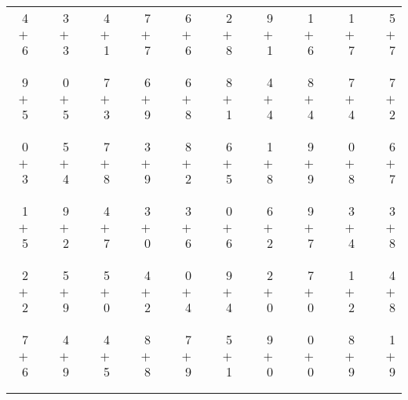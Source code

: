 \documentclass[12pt, letterpaper]{article}
\begin{document}
\begin{tabular}{rrrrrrrrrrrrrrrrrrr}
4 & & 3 & & 4 & & 7 & & 6 & & 2 & & 9 & & 1 & & 1 & & 5\\
$+$ 6 & & $+$ 3 & & $+$ 1 & & $+$ 7 & & $+$ 6 & & $+$ 8 & & $+$ 1 & & $+$ 6 & & $+$ 7 & & $+$ 7\\
\cline{1-1} \cline{3-3} \cline{5-5} \cline{7-7} \cline{9-9} \cline{11-11} \cline{13-13} \cline{15-15} \cline{17-17} \cline{19-19} \\ \\
9 & & 0 & & 7 & & 6 & & 6 & & 8 & & 4 & & 8 & & 7 & & 7\\
$+$ 5 & & $+$ 5 & & $+$ 3 & & $+$ 9 & & $+$ 8 & & $+$ 1 & & $+$ 4 & & $+$ 4 & & $+$ 4 & & $+$ 2\\
\cline{1-1} \cline{3-3} \cline{5-5} \cline{7-7} \cline{9-9} \cline{11-11} \cline{13-13} \cline{15-15} \cline{17-17} \cline{19-19} \\ \\
0 & & 5 & & 7 & & 3 & & 8 & & 6 & & 1 & & 9 & & 0 & & 6\\
$+$ 3 & & $+$ 4 & & $+$ 8 & & $+$ 9 & & $+$ 2 & & $+$ 5 & & $+$ 8 & & $+$ 9 & & $+$ 8 & & $+$ 7\\
\cline{1-1} \cline{3-3} \cline{5-5} \cline{7-7} \cline{9-9} \cline{11-11} \cline{13-13} \cline{15-15} \cline{17-17} \cline{19-19} \\ \\
1 & & 9 & & 4 & & 3 & & 3 & & 0 & & 6 & & 9 & & 3 & & 3\\
$+$ 5 & & $+$ 2 & & $+$ 7 & & $+$ 0 & & $+$ 6 & & $+$ 6 & & $+$ 2 & & $+$ 7 & & $+$ 4 & & $+$ 8\\
\cline{1-1} \cline{3-3} \cline{5-5} \cline{7-7} \cline{9-9} \cline{11-11} \cline{13-13} \cline{15-15} \cline{17-17} \cline{19-19} \\ \\
2 & & 5 & & 5 & & 4 & & 0 & & 9 & & 2 & & 7 & & 1 & & 4\\
$+$ 2 & & $+$ 9 & & $+$ 0 & & $+$ 2 & & $+$ 4 & & $+$ 4 & & $+$ 0 & & $+$ 0 & & $+$ 2 & & $+$ 8\\
\cline{1-1} \cline{3-3} \cline{5-5} \cline{7-7} \cline{9-9} \cline{11-11} \cline{13-13} \cline{15-15} \cline{17-17} \cline{19-19} \\ \\
7 & & 4 & & 4 & & 8 & & 7 & & 5 & & 9 & & 0 & & 8 & & 1\\
$+$ 6 & & $+$ 9 & & $+$ 5 & & $+$ 8 & & $+$ 9 & & $+$ 1 & & $+$ 0 & & $+$ 0 & & $+$ 9 & & $+$ 9\\
\cline{1-1} \cline{3-3} \cline{5-5} \cline{7-7} \cline{9-9} \cline{11-11} \cline{13-13} \cline{15-15} \cline{17-17} \cline{19-19} \\ \\

\end{tabular}
\end{document}
